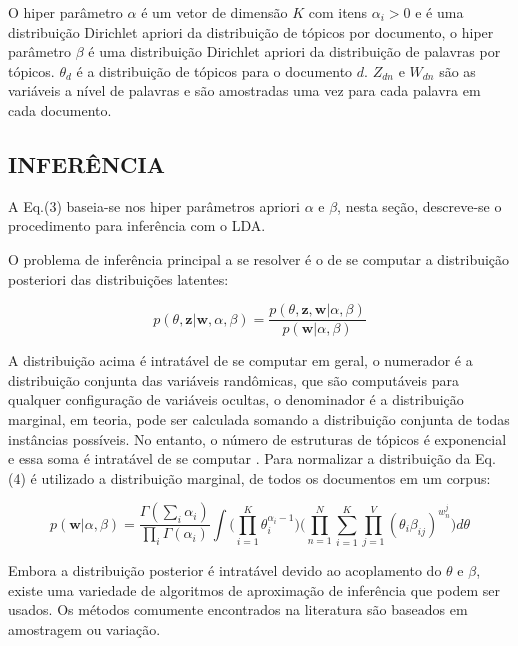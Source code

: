 \documentclass[12pt,a4paper]{article}
\begin{document}
O hiper parâmetro $\alpha$ é um vetor de dimensão $K$ com itens \(\alpha _i>0\) e é uma distribuição Dirichlet apriori da distribuição de tópicos por documento,
o hiper parâmetro $\beta$ é uma distribuição Dirichlet apriori da distribuição de palavras por tópicos. $\theta _d$ é a distribuição de tópicos para o documento $d$. $Z_{dn}$ e $W_{dn}$ são as variáveis a nível de palavras e são amostradas uma vez para cada palavra em cada documento.


\subsection{INFERÊNCIA}
A Eq.(3) baseia-se nos hiper parâmetros apriori $\alpha$ e $\beta$, nesta seção, descreve-se o procedimento para inferência com o LDA.

O problema de inferência principal a se resolver é o de se computar a distribuição posteriori das distribuições latentes:

\begin{equation}
p(\theta,\textbf{z}|\textbf{w},\alpha,\beta) = \frac{p(\theta,\textbf{z},\textbf{w}|\alpha,\beta)}{p(\textbf{w}|\alpha,\beta)}
\end{equation}

A distribuição acima é intratável de se computar em geral, o numerador é a distribuição conjunta das variáveis randômicas, que são computáveis para qualquer configuração de variáveis ocultas,
 o denominador é a distribuição marginal, em teoria, pode ser calculada somando a distribuição conjunta de todas instâncias possíveis. No entanto,
 o número de estruturas de tópicos é exponencial e essa soma é intratável de se computar \cite{blei2012probabilistic}. Para normalizar a distribuição da Eq.(4) é utilizado a distribuição marginal,
 de todos os documentos em um corpus:

\begin{equation}
p(\textbf{w}|\alpha,\beta)=\frac{\Gamma(\sum_{i}\alpha_i)}{\prod_{i}\Gamma(\alpha_i)}\int{\Bigg(\prod_{i=1}^{K}\theta_i^{\alpha_i-1}\Bigg)} \Bigg(\prod_{n=1}^{N}\sum_{i=1}^{K}\prod_{j=1}^{V}(\theta_i\beta_{ij})^{w_n^j}\Bigg)d\theta
\end{equation}

Embora a distribuição posterior é intratável devido ao acoplamento do $\theta$ e $\beta$, existe uma variedade de algoritmos de aproximação de inferência que podem ser usados. Os métodos comumente encontrados na literatura são baseados em amostragem ou variação.
\end{document}

